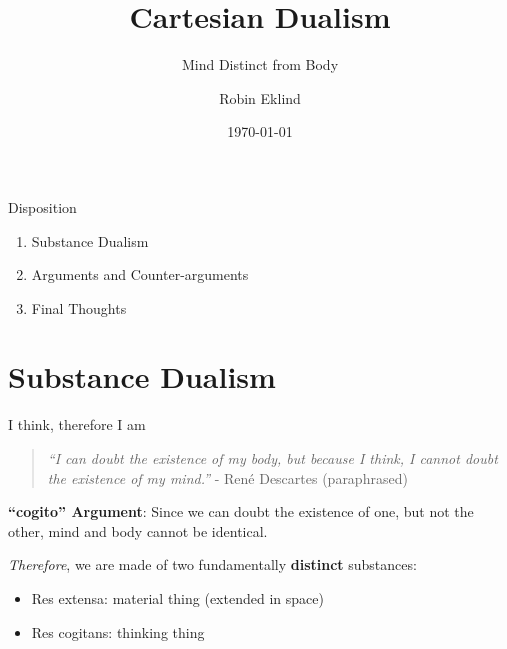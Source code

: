 \documentclass[aspectratio=1610]{beamer}
\title{Cartesian Dualism}
\subtitle{Mind Distinct from Body}
\date{\today}
\author{Robin Eklind}
\begin{document}

\maketitle


\begin{frame}{Disposition}
	\begin{enumerate}
		\item Substance Dualism
		\item Arguments and Counter-arguments
		\item Final Thoughts
	\end{enumerate}
\end{frame}


\section{Substance Dualism}



\begin{frame}{I think, therefore I am}
	\begin{quote}
		\textit{``I can doubt the existence of my body, but because I think, I cannot doubt the existence of my mind.''}
		- René Descartes {\tiny (paraphrased)}
	\end{quote}

	\pause
	\vspace{2em}

	\textbf{``cogito'' Argument}: Since we can doubt the existence of one, but not the other, mind and body cannot be identical.

	\pause
	\vspace{2em}

	\emph{Therefore}, we are made of two fundamentally \textbf{distinct} substances:
	\begin{itemize}
		\item \alert{Res extensa}: material thing (extended in space)
		\item \alert{Res cogitans}: thinking thing
	\end{itemize}

\end{frame}
\end{document}
